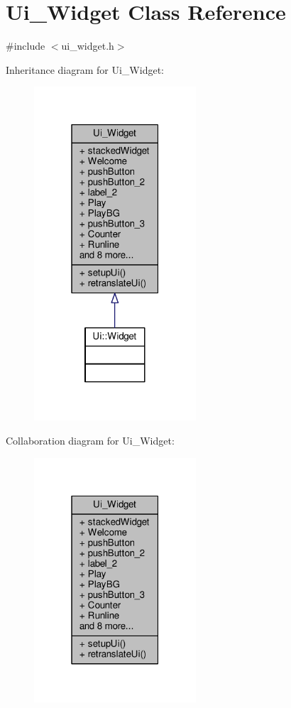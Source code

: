 \hypertarget{classUi__Widget}{}\section{Ui\+\_\+\+Widget Class Reference}
\label{classUi__Widget}


{\ttfamily \#include $<$ui\+\_\+widget.\+h$>$}



Inheritance diagram for Ui\+\_\+\+Widget\+:
\nopagebreak
\begin{figure}[H]
\begin{center}
\leavevmode
\includegraphics[width=171pt]{classUi__Widget__inherit__graph}
\end{center}
\end{figure}


Collaboration diagram for Ui\+\_\+\+Widget\+:
\nopagebreak
\begin{figure}[H]
\begin{center}
\leavevmode
\includegraphics[width=171pt]{classUi__Widget__coll__graph}
\end{center}
\end{figure}
